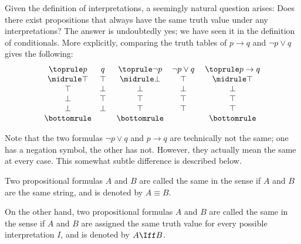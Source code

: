 Given the definition of interpretations,
a seemingly natural question arises:
Does there exist propositions that always have the same truth value
under any interpretations?
The answer is undoubtedly yes;
we have seen it in the definition of conditionals.
More explicitly,
comparing the truth tables of \(p\to q\) and \(\neg p\vee q\)
gives the following:
\[
    \begin{array}{c c}\toprule
        p & q \\ \midrule
        \top & \top \\
        \top & \bot \\
        \bot & \top \\
        \bot & \bot \\ \bottomrule
    \end{array}
    \;
    \begin{array}{c c}\toprule
        \neg p & \neg p\vee q \\ \midrule
        \bot & \top \\
        \bot & \bot \\
        \top & \top \\
        \top & \top \\ \bottomrule
    \end{array}
    \;
    \begin{array}{c} \toprule
        p\to q \\ \midrule
        \top \\
        \bot \\
        \top \\
        \top \\ \bottomrule
    \end{array}
\]

Note that
the two formulas \(\neg p\vee q\) and \(p\to q\)
are technically not the same;
one has a negation symbol, the other has not.
However, they actually mean the same at every case.
This somewhat subtle difference is described below.

\begin{definition}
    \label{def:synsem}
    Two propositional formulas \(A\) and \(B\)
    are called the same in the  sense
    if \(A\) and \(B\) are the same string,
    and is denoted by \(A\equiv B\).

    On the other hand,
    two propositional formulas \(A\) and \(B\)
    are called the same in the  sense
    if \(A\) and \(B\) are assigned the same truth value
    for every possible interpretation \(I\),
    and is denoted by \(A\Iff B\).
\end{definition}

